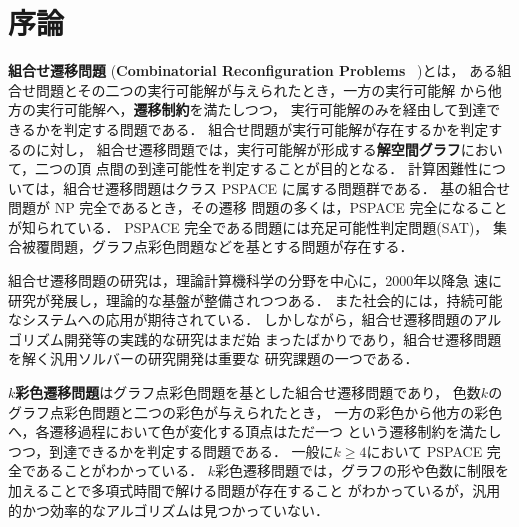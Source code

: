 \chapter{序論} \label{chap:introduction}


\textbf{組合せ遷移問題} (\textbf{Combinatorial Reconfiguration Problems}
~\cite{Ito18:tohoku})とは，
ある組合せ問題とその二つの実行可能解が与えられたとき，一方の実行可能解
から他方の実行可能解へ，\textbf{遷移制約}を満たしつつ，
実行可能解のみを経由して到達できるかを判定する問題である．
組合せ問題が実行可能解が存在するかを判定するのに対し，
組合せ遷移問題では，実行可能解が形成する\textbf{解空間グラフ}において，二つの頂
点間の到達可能性を判定することが目的となる．
計算困難性については，組合せ遷移問題はクラス PSPACE に属する問題群である．
基の組合せ問題が NP 完全であるとき，その遷移
問題の多くは，PSPACE 完全になることが知られている．
PSPACE 完全である問題には充足可能性判定問題(SAT)，
集合被覆問題，グラフ点彩色問題などを基とする問題が存在する．

組合せ遷移問題の研究は，理論計算機科学の分野を中心に，2000年以降急
速に研究が発展し，理論的な基盤が整備されつつある．
また社会的には，持続可能なシステムへの応用が期待されている．
しかしながら，組合せ遷移問題のアルゴリズム開発等の実践的な研究はまだ始
まったばかりであり，組合せ遷移問題を解く汎用ソルバーの研究開発は重要な
研究課題の一つである．

\textbf{$k$彩色遷移問題}はグラフ点彩色問題を基とした組合せ遷移問題であり，
色数$k$のグラフ点彩色問題と二つの彩色が与えられたとき，
一方の彩色から他方の彩色へ，各遷移過程において色が変化する頂点はただ一つ
という遷移制約を満たしつつ，到達できるかを判定する問題である．
一般に$k \ge 4$において PSPACE 完全であることがわかっている．
$k$彩色遷移問題では，グラフの形や色数に制限を加えることで多項式時間で解ける問題が存在すること
がわかっているが，汎用的かつ効率的なアルゴリズムは見つかっていない．

